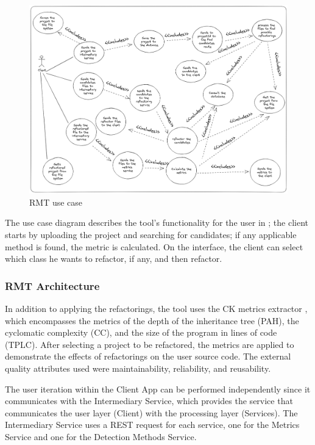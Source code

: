 \begin{figure}[ht!]
\SetCaptionWidth{\textwidth}
\caption{RMT use case}
\label{fig-usecase}
\includegraphics[width =\textwidth]{Chapter-2/Figures/usecase.png}
\end{figure}
\FloatBarrier

The use case diagram describes the tool's functionality for the user in ; the client starts by uploading the project and searching for candidates; if any applicable method is found, the metric is calculated. On the interface, the client can select which class he wants to refactor, if any, and then refactor.

\subsubsection{RMT Architecture}
\label{sub-architecture}

 In addition to applying the refactorings, the tool uses the CK metrics extractor \cite{ck}, which encompasses the metrics of the depth of the inheritance tree (PAH), the cyclomatic complexity (CC), and the size of the program in lines of code (TPLC). After selecting a project to be refactored, the metrics are applied to demonstrate the effects of refactorings on the user source code. The external quality attributes used were maintainability, reliability, and reusability.

The user iteration within the Client App can be performed independently since it communicates with the Intermediary Service, which provides the service that communicates the user layer (Client) with the processing layer (Services). The Intermediary Service uses a REST request for each service, one for the Metrics Service and one for the Detection Methods Service.

